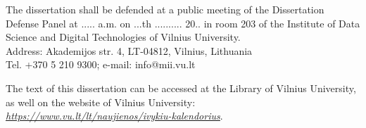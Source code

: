 \vspace{2cm}
\noindent 
The dissertation shall be defended at a public meeting of the Dissertation Defense Panel at ..... a.m. on ...th .......... 20.. in room 203 of the Institute of Data Science and Digital Technologies of Vilnius University. \\
Address: Akademijos str. 4, LT-04812, Vilnius, Lithuania \\
Tel. +370 5 210 9300; e-mail: info@mii.vu.lt

\vspace{1cm}
\noindent
The text of this dissertation can be accessed at the Library of Vilnius
University, as well on the website of Vilnius University: \\ 
\href{https://www.vu.lt/lt/naujienos/ivykiu-kalendorius}{ \textit{\underline{https://www.vu.lt/lt/naujienos/ivykiu-kalendorius}}}.


